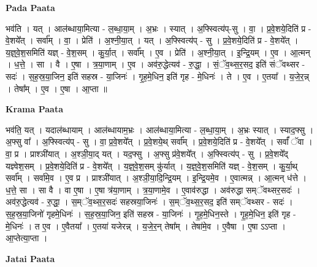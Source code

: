 \documentclass[17pt]{extarticle}
\begin{document}
\textbf{Pada Paata} \newline

भव॑ति । यत् । आल॑ब्धाया॒मित्या - ल॒ब्धा॒या॒म् । अ॒भ्रः । स्यात् । अ॒फ्स्वित्य॑प्-सु । वा॒ । प्र॒वे॒शये॒दिति॑ प्र - वे॒शये᳚त् । सर्वा᳚म् । वा॒ । प्रेति॑ । अ॒श्नी॒या॒त् । यत् । अ॒फ्स्वित्य॑प् - सु । प्र॒वे॒शये॒दिति॑ प्र - वे॒शये᳚त् । य॒ज्ञ्॒वे॒श॒समिति॑ यज्ञ् - वे॒श॒सम् । कु॒र्या॒त् । सर्वा᳚म् । ए॒व । प्रेति॑ । अ॒श्नी॒या॒त् । इ॒न्द्रि॒यम् । ए॒व । आ॒त्मन् । ध॒त्ते॒ । सा । वै । ए॒षा । त्र॒या॒णाम् । ए॒व । अव॑रु॒द्धेत्यव॑ - रु॒द्धा॒ । सं॒ॅव॒थ्स॒र॒सद॒ इति॑ संॅवथ्सर - सदः॑ । स॒ह॒स्र॒या॒जिन॒ इति॑ सहस्र - या॒जिनः॑ । गृ॒ह॒मे॒धिन॒ इति॑ गृह - मे॒धिनः॑ । ते । ए॒व । ए॒तया᳚ । य॒जे॒र॒न्न् । तेषा᳚म् । ए॒व । ए॒षा । आ॒प्ता ॥  \newline


\textbf{Krama Paata} \newline

भव॑ति॒ यत् । यदाल॑ब्धायाम् । आल॑ब्धायाम॒भ्रः । आल॑ब्धाया॒मित्या - ल॒ब्धा॒या॒म् । अ॒भ्रः स्यात् । स्याद॒फ्सु । अ॒फ्सु वा᳚ । अ॒फ्स्वित्य॑प् - सु । वा॒ प्र॒वे॒शये᳚त् । प्र॒वे॒शये॒थ् सर्वा᳚म् । प्र॒वे॒शये॒दिति॑ प्र - वे॒शये᳚त् । सर्वां᳚ ॅवा । वा॒ प्र । प्राश्ञी॑यात् । अ॒श्ञी॒या॒द् यत् । यद॒फ्सु । अ॒फ्सु प्र॑वे॒शये᳚त् । अ॒फ्स्वित्य॑प् - सु । प्र॒वे॒शये᳚द् यज्ञ्वेश॒सम् । प्र॒वे॒शये॒दिति॑ प्र - वे॒शये᳚त् । य॒ज्ञ्॒वे॒श॒सम् कु॑र्यात् । य॒ज्ञ्॒वे॒श॒समिति॑ यज्ञ् - वे॒श॒सम् । कु॒र्या॒थ् सर्वा᳚म् । सर्वा॑मे॒व । ए॒व प्र । प्राश्ञी॑यात् । अ॒श्ञी॒या॒दि॒न्द्रि॒यम् । इ॒न्द्रि॒यमे॒व । ए॒वात्मन्न् । आ॒त्मन् ध॑त्ते । ध॒त्ते॒ सा । सा वै । वा ए॒षा । ए॒षा त्र॑या॒णाम् । त्र॒या॒णामे॒व । ए॒वाव॑रुद्धा । अव॑रुद्धा सम्ॅवथ्सर॒सदः॑ । अव॑रु॒द्धेत्यव॑ - रु॒द्धा॒ । स॒म्ॅव॒थ्स॒र॒सदः॑ सहस्रया॒जिनः॑ । स॒म्ॅव॒थ्स॒र॒सद॒ इति॑ सम्ॅवथ्सर - सदः॑ । स॒ह॒स्र॒या॒जिनो॑ गृहमे॒धिनः॑ । स॒ह॒स्र॒या॒जिन॒ इति॑ सहस्र - या॒जिनः॑ । गृ॒ह॒मे॒धिन॒स्ते । गृ॒ह॒मे॒धिन॒ इति॑ गृह - मे॒धिनः॑ । त ए॒व । ए॒वैतया᳚ । ए॒तया॑ यजेरन्न् । य॒जे॒र॒न् तेषा᳚म् । तेषा॑मे॒व । ए॒वैषा । ए॒षा ऽऽप्ता । आ॒प्तेत्या॒प्ता । \newline

\textbf{Jatai Paata} \newline
\end{document}

